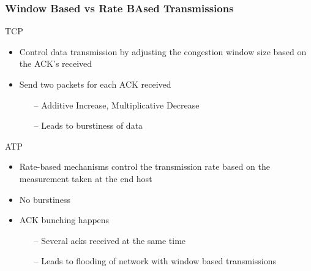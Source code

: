 \begin{frame}[t]
  \frametitle{Window Based vs Rate BAsed Transmissions}

  TCP
  \begin{itemize}
  \item Control data transmission by adjusting the congestion window size based on the ACK’s received
  \item Send two packets for each ACK received
    \begin{itemize}
      \item[--] Additive Increase, Multiplicative Decrease
      \item[--] Leads to burstiness of data
    \end{itemize}
  \end{itemize}

  \vfill

  ATP
  \begin{itemize}
  \item Rate-based mechanisms control the transmission rate based on the measurement taken at the end host
  \item No burstiness
  \item ACK bunching happens
    \begin{itemize}
      \item[--] Several acks received at the same time
      \item[--] Leads to flooding of network with window based transmissions
    \end{itemize}
  \end{itemize}

    \vfill

  \begin{flushleft}
    \begin{tiny}
      \begin{minipage}{1.0\linewidth}
      \end{minipage}
    \end{tiny}
  \end{flushleft}

\end{frame}    

